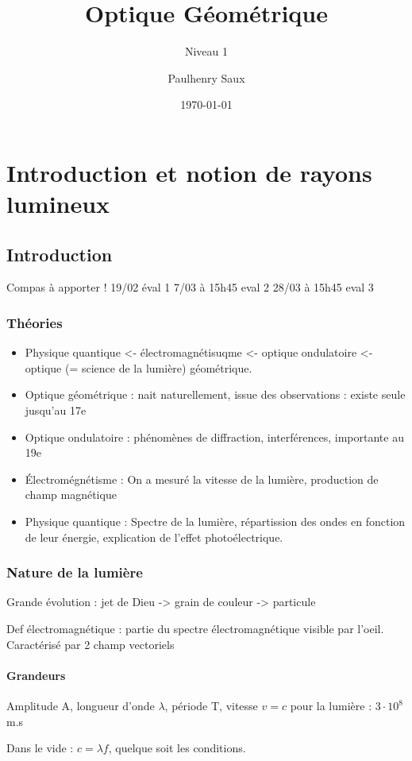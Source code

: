 \documentclass[french]{yLectureNote}
\title{Optique Géométrique}
\subtitle{Niveau 1}
\author{Paulhenry Saux}
\date{\today}
\begin{document}

	\chapter{Introduction et notion de rayons lumineux}
	\section{Introduction}
	Compas à apporter !
	19/02 éval 1
	7/03 à 15h45 eval 2
	28/03 à 15h45 eval 3
	\subsection{Théories}
	\begin{itemize}
	 \item Physique quantique <- électromagnétisuqme <- optique ondulatoire <- optique (= science de la lumière) géométrique.

	\item Optique géométrique : nait naturellement, issue des observations : existe seule jusqu'au 17e

	\item Optique ondulatoire : phénomènes de diffraction, interférences, importante au 19e

	\item Électromégnétisme : On a mesuré la vitesse de la lumière, production de champ magnétique

	\item Physique quantique : Spectre de la lumière, répartission des ondes en fonction de leur énergie, explication de l'effet photoélectrique.

	\end{itemize}
\subsection{Nature de la lumière}
Grande évolution : jet de Dieu -> grain de couleur -> particule

Def électromagnétique : partie du spectre électromagnétique visible par l'oeil. Caractérisé par 2 champ vectoriels

\subsubsection{Grandeurs}
Amplitude A, longueur d'onde $\lambda$, période T, vitesse $v = c$ pour la lumière : $3\cdot 10^{8}$ m.s

Dans le vide : $c = \lambda f$, quelque soit les conditions.
\end{document}
